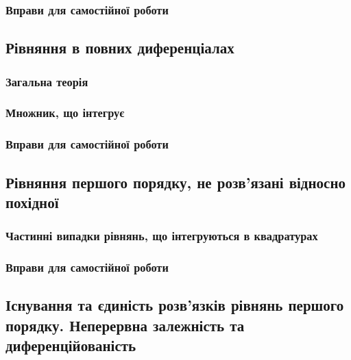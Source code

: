 		\subsubsection{Вправи для самостійної роботи}
		

	\subsection{Рівняння в повних диференціалах}
	

		\subsubsection{Загальна теорія}
		

		\subsubsection{Множник, що інтегрує}
		

		\subsubsection{Вправи для самостійної роботи}
		

	\subsection{Рівняння першого порядку, не розв'язані відносно похідної}
	

		\subsubsection{Частинні випадки рівнянь, що інтегруються в квадратурах}
		

		\subsubsection{Вправи для самостійної роботи}
		

	\subsection{Існування та єдиність розв'язків рівнянь першого порядку. Неперервна залежність та диференційованість}
	

